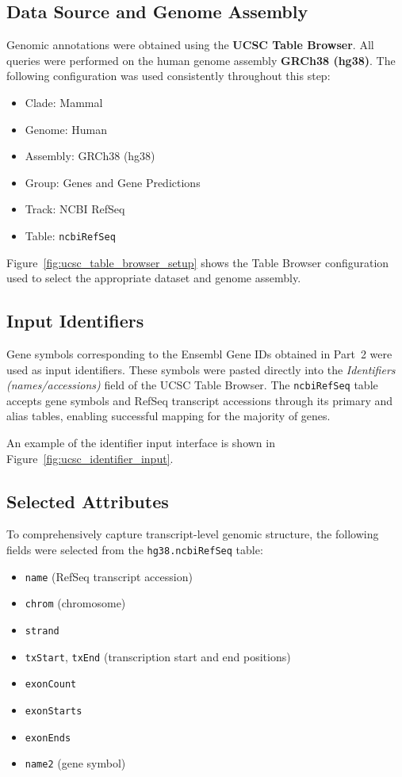 \documentclass[11pt]{article}
\begin{document}
\subsection{Data Source and Genome Assembly}

Genomic annotations were obtained using the \textbf{UCSC Table Browser}. All queries were performed on the human genome assembly \textbf{GRCh38 (hg38)}. The following configuration was used consistently throughout this step:
\begin{itemize}
	\item Clade: Mammal
	\item Genome: Human
	\item Assembly: GRCh38 (hg38)
	\item Group: Genes and Gene Predictions
	\item Track: NCBI RefSeq
	\item Table: \texttt{ncbiRefSeq}
\end{itemize}

Figure~\ref{fig:ucsc_table_browser_setup} shows the Table Browser configuration used to select the appropriate dataset and genome assembly.

\subsection{Input Identifiers}

Gene symbols corresponding to the Ensembl Gene IDs obtained in Part~2 were used as input identifiers. These symbols were pasted directly into the \emph{Identifiers (names/accessions)} field of the UCSC Table Browser. The \texttt{ncbiRefSeq} table accepts gene symbols and RefSeq transcript accessions through its primary and alias tables, enabling successful mapping for the majority of genes.

An example of the identifier input interface is shown in Figure~\ref{fig:ucsc_identifier_input}.

\subsection{Selected Attributes}

To comprehensively capture transcript-level genomic structure, the following fields were selected from the \texttt{hg38.ncbiRefSeq} table:
\begin{itemize}
	\item \texttt{name} (RefSeq transcript accession)
	\item \texttt{chrom} (chromosome)
	\item \texttt{strand}
	\item \texttt{txStart}, \texttt{txEnd} (transcription start and end positions)
	\item \texttt{exonCount}
	\item \texttt{exonStarts}
	\item \texttt{exonEnds}
	\item \texttt{name2} (gene symbol)
\end{itemize}
\end{document}
